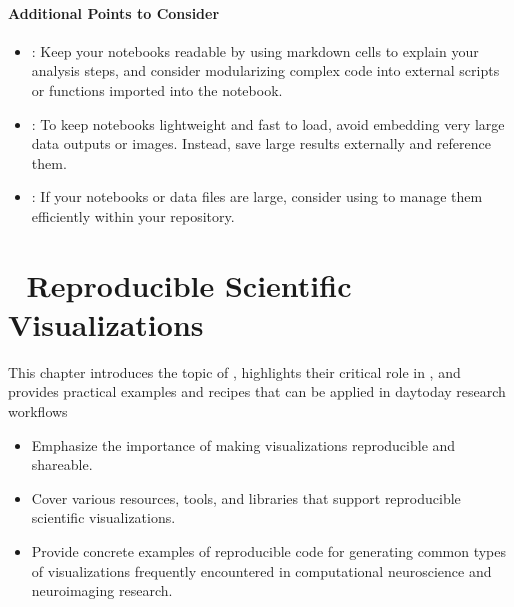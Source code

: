 \documentclass[letterpaper,10pt,english]{jupyterBook}
\begin{document}
\subsubsection{Additional Points to Consider}
\label{\detokenize{chapters/02/02b_jupyter-notebooks:additional-points-to-consider}}\begin{itemize}
\item {} 
\sphinxAtStartPar
{}: Keep your notebooks readable by using markdown cells to explain your analysis steps, and consider modularizing complex code into external scripts or functions imported into the notebook.

\item {} 
\sphinxAtStartPar
{}: To keep notebooks lightweight and fast to load, avoid embedding very large data outputs or images. Instead, save large results externally and reference them.

\item {} 
\sphinxAtStartPar
{}: If your notebooks or data files are large, consider using  to manage them efficiently within your repository.

\end{itemize}

\sphinxstepscope


\chapter{📙 Reproducible Scientific Visualizations}
\label{\detokenize{chapters/03/reproducible-visualizations:reproducible-scientific-visualizations}}\label{\detokenize{chapters/03/reproducible-visualizations::doc}}
\sphinxAtStartPar
This chapter introduces the topic of , highlights their critical role in , and provides practical examples and recipes that can be applied in day\sphinxhyphen{}to\sphinxhyphen{}day research workflows

\sphinxAtStartPar
{}
\begin{itemize}
\item {} 
\sphinxAtStartPar
Emphasize the importance of making visualizations reproducible and shareable.

\item {} 
\sphinxAtStartPar
Cover various resources, tools, and libraries that support reproducible scientific visualizations.

\item {} 
\sphinxAtStartPar
Provide concrete examples of reproducible code for generating common types of visualizations frequently encountered in computational neuroscience and neuroimaging research.

\end{itemize}
\end{document}
